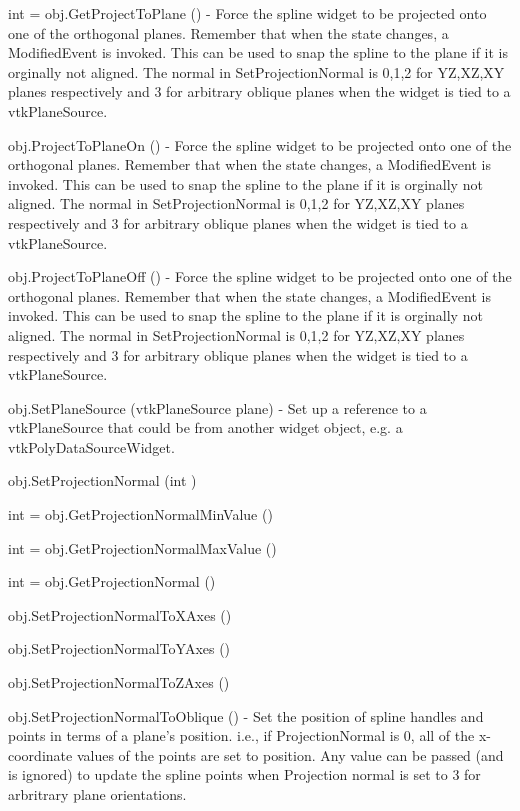 \begin{DoxyItemize}
\item {\ttfamily int = obj.\-Get\-Project\-To\-Plane ()} -\/ Force the spline widget to be projected onto one of the orthogonal planes. Remember that when the state changes, a Modified\-Event is invoked. This can be used to snap the spline to the plane if it is orginally not aligned. The normal in Set\-Projection\-Normal is 0,1,2 for Y\-Z,X\-Z,X\-Y planes respectively and 3 for arbitrary oblique planes when the widget is tied to a vtk\-Plane\-Source.  
\item {\ttfamily obj.\-Project\-To\-Plane\-On ()} -\/ Force the spline widget to be projected onto one of the orthogonal planes. Remember that when the state changes, a Modified\-Event is invoked. This can be used to snap the spline to the plane if it is orginally not aligned. The normal in Set\-Projection\-Normal is 0,1,2 for Y\-Z,X\-Z,X\-Y planes respectively and 3 for arbitrary oblique planes when the widget is tied to a vtk\-Plane\-Source.  
\item {\ttfamily obj.\-Project\-To\-Plane\-Off ()} -\/ Force the spline widget to be projected onto one of the orthogonal planes. Remember that when the state changes, a Modified\-Event is invoked. This can be used to snap the spline to the plane if it is orginally not aligned. The normal in Set\-Projection\-Normal is 0,1,2 for Y\-Z,X\-Z,X\-Y planes respectively and 3 for arbitrary oblique planes when the widget is tied to a vtk\-Plane\-Source.  
\item {\ttfamily obj.\-Set\-Plane\-Source (vtk\-Plane\-Source plane)} -\/ Set up a reference to a vtk\-Plane\-Source that could be from another widget object, e.\-g. a vtk\-Poly\-Data\-Source\-Widget.  
\item {\ttfamily obj.\-Set\-Projection\-Normal (int )}  
\item {\ttfamily int = obj.\-Get\-Projection\-Normal\-Min\-Value ()}  
\item {\ttfamily int = obj.\-Get\-Projection\-Normal\-Max\-Value ()}  
\item {\ttfamily int = obj.\-Get\-Projection\-Normal ()}  
\item {\ttfamily obj.\-Set\-Projection\-Normal\-To\-X\-Axes ()}  
\item {\ttfamily obj.\-Set\-Projection\-Normal\-To\-Y\-Axes ()}  
\item {\ttfamily obj.\-Set\-Projection\-Normal\-To\-Z\-Axes ()}  
\item {\ttfamily obj.\-Set\-Projection\-Normal\-To\-Oblique ()} -\/ Set the position of spline handles and points in terms of a plane's position. i.\-e., if Projection\-Normal is 0, all of the x-\/coordinate values of the points are set to position. Any value can be passed (and is ignored) to update the spline points when Projection normal is set to 3 for arbritrary plane orientations.  

\end{DoxyItemize}
